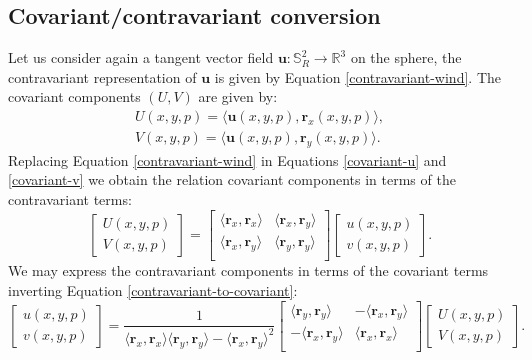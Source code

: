 \subsection{Covariant/contravariant conversion}
\label{anexo-cov-con}
Let us consider again a tangent vector field $\boldsymbol{u}: \mathbb{S}^2_R \to 
\mathbb{R}^3$ on the sphere, the contravariant representation of 
$\boldsymbol{u}$ is given by Equation \eqref{contravariant-wind}.
The covariant components $(U,V)$ are given by:
\begin{align}
	\label{covariant-u}
	U(x,y,p) = \langle \boldsymbol{u}(x,y,p) , \boldsymbol{r}_x(x,y,p)  \rangle, \\
	\label{covariant-v}
	V(x,y,p) = \langle \boldsymbol{u}(x,y,p) , \boldsymbol{r}_y(x,y,p)  \rangle.
\end{align}
Replacing Equation \eqref{contravariant-wind} in 
Equations \eqref{covariant-u} and \eqref{covariant-v} we obtain
the relation covariant components in terms of the
contravariant terms:
\begin{equation}
	\label{contravariant-to-covariant}
	\begin{bmatrix}
		{U}(x,y,p) \\
		{V}(x,y,p)
	\end{bmatrix}
	=
	\begin{bmatrix}
		  \langle \boldsymbol{r}_x, \boldsymbol{r}_x \rangle
		& \langle \boldsymbol{r}_x, \boldsymbol{r}_y \rangle \\
		  \langle \boldsymbol{r}_x, \boldsymbol{r}_y \rangle 
		& \langle \boldsymbol{r}_y, \boldsymbol{r}_y \rangle \\
	\end{bmatrix}
	\begin{bmatrix}
		{u} (x,y,p) \\
		{v} (x,y,p) 
	\end{bmatrix}.
\end{equation}
We may express the contravariant components in terms of 
the covariant terms inverting Equation \eqref{contravariant-to-covariant}:
\begin{equation}
	\label{convariant-to-contravariant}
	\begin{bmatrix}
		{u}(x,y,p) \\
		{v}(x,y,p)
	\end{bmatrix}
	= \frac{1}{\langle \boldsymbol{r}_x, \boldsymbol{r}_x \rangle
               \langle \boldsymbol{r}_y, \boldsymbol{r}_y \rangle
             - \langle \boldsymbol{r}_x, \boldsymbol{r}_y \rangle^2}
	\begin{bmatrix}
		  \langle \boldsymbol{r}_y, \boldsymbol{r}_y \rangle
		& -\langle \boldsymbol{r}_x, \boldsymbol{r}_y \rangle \\
		  -\langle \boldsymbol{r}_x, \boldsymbol{r}_y \rangle 
		& \langle \boldsymbol{r}_x, \boldsymbol{r}_x \rangle \\
	\end{bmatrix}
	\begin{bmatrix}
		{U} (x,y,p) \\
		{V} (x,y,p) 
	\end{bmatrix}.
\end{equation}
